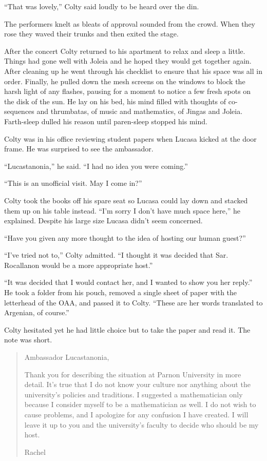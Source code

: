 ``That was lovely,'' Colty said loudly to be heard over the din.

The performers knelt as bleats of approval sounded from the crowd. When they rose they waved
their trunks and then exited the stage.

After the concert Colty returned to his apartment to relax and sleep a little. Things had gone
well with Joleia and he hoped they would get together again. After cleaning up he went through
his checklist to ensure that his space was all in order. Finally, he pulled down the mesh
screens on the windows to block the harsh light of any flashes, pausing for a moment to notice a
few fresh spots on the disk of the sun. He lay on his bed, his mind filled with thoughts of
co-sequences and thrumbatas, of music and mathematics, of Jingas and Joleia. Farth-sleep dulled
his reason until paren-sleep stopped his mind.

\spacebreak

Colty was in his office reviewing student papers when Lucasa kicked at the door frame. He was
surprised to see the ambassador.

``Lucastanonia,'' he said. ``I had no idea you were coming.''

``This is an unofficial visit. May I come in?''

Colty took the books off his spare seat so Lucasa could lay down and stacked them up on his
table instead. ``I'm sorry I don't have much space here,'' he explained. Despite his large size
Lucasa didn't seem concerned.

``Have you given any more thought to the idea of hosting our human guest?''

``I've tried not to,'' Colty admitted. ``I thought it was decided that Sar. Rocallanon would be
a more appropriate host.''

``It was decided that I would contact her, and I wanted to show you her reply.'' He took a
folder from his pouch, removed a single sheet of paper with the letterhead of the OAA, and
passed it to Colty. ``These are her words translated to Argenian, of course.''

Colty hesitated yet he had little choice but to take the paper and read it. The note was short.

\begin{quotation}
Ambassador Lucastanonia,

Thank you for describing the situation at Parnon University in more detail. It's true that I do
not know your culture nor anything about the university's policies and traditions. I suggested a
mathematician only because I consider myself to be a mathematician as well. I do not wish to
cause problems, and I apologize for any confusion I have created. I will leave it up to you and
the university's faculty to decide who should be my host.

Rachel
\end{quotation}


